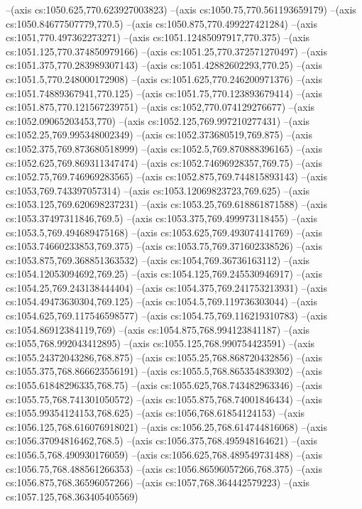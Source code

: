 --(axis cs:1050.625,770.623927003823)
--(axis cs:1050.75,770.561193659179)
--(axis cs:1050.84677507779,770.5)
--(axis cs:1050.875,770.499227421284)
--(axis cs:1051,770.497362273271)
--(axis cs:1051.12485097917,770.375)
--(axis cs:1051.125,770.374850979166)
--(axis cs:1051.25,770.372571270497)
--(axis cs:1051.375,770.283989307143)
--(axis cs:1051.42882602293,770.25)
--(axis cs:1051.5,770.248000172908)
--(axis cs:1051.625,770.246200971376)
--(axis cs:1051.74889367941,770.125)
--(axis cs:1051.75,770.123893679414)
--(axis cs:1051.875,770.121567239751)
--(axis cs:1052,770.074129276677)
--(axis cs:1052.09065203453,770)
--(axis cs:1052.125,769.997210277431)
--(axis cs:1052.25,769.995348002349)
--(axis cs:1052.373680519,769.875)
--(axis cs:1052.375,769.873680518999)
--(axis cs:1052.5,769.870888396165)
--(axis cs:1052.625,769.869311347474)
--(axis cs:1052.74696928357,769.75)
--(axis cs:1052.75,769.746969283565)
--(axis cs:1052.875,769.744815893143)
--(axis cs:1053,769.743397057314)
--(axis cs:1053.12069823723,769.625)
--(axis cs:1053.125,769.620698237231)
--(axis cs:1053.25,769.618861871588)
--(axis cs:1053.37497311846,769.5)
--(axis cs:1053.375,769.499973118455)
--(axis cs:1053.5,769.494689475168)
--(axis cs:1053.625,769.493074141769)
--(axis cs:1053.74660233853,769.375)
--(axis cs:1053.75,769.371602338526)
--(axis cs:1053.875,769.368851363532)
--(axis cs:1054,769.36736163112)
--(axis cs:1054.12053094692,769.25)
--(axis cs:1054.125,769.245530946917)
--(axis cs:1054.25,769.243138444404)
--(axis cs:1054.375,769.241753213931)
--(axis cs:1054.49473630304,769.125)
--(axis cs:1054.5,769.119736303044)
--(axis cs:1054.625,769.117546598577)
--(axis cs:1054.75,769.116219310783)
--(axis cs:1054.86912384119,769)
--(axis cs:1054.875,768.994123841187)
--(axis cs:1055,768.992043412895)
--(axis cs:1055.125,768.990754423591)
--(axis cs:1055.24372043286,768.875)
--(axis cs:1055.25,768.868720432856)
--(axis cs:1055.375,768.866623556191)
--(axis cs:1055.5,768.865354839302)
--(axis cs:1055.61848296335,768.75)
--(axis cs:1055.625,768.743482963346)
--(axis cs:1055.75,768.741301050572)
--(axis cs:1055.875,768.74001846434)
--(axis cs:1055.99354124153,768.625)
--(axis cs:1056,768.61854124153)
--(axis cs:1056.125,768.616076918021)
--(axis cs:1056.25,768.614744816068)
--(axis cs:1056.37094816462,768.5)
--(axis cs:1056.375,768.495948164621)
--(axis cs:1056.5,768.490930176059)
--(axis cs:1056.625,768.489549731488)
--(axis cs:1056.75,768.488561266353)
--(axis cs:1056.86596057266,768.375)
--(axis cs:1056.875,768.36596057266)
--(axis cs:1057,768.364442579223)
--(axis cs:1057.125,768.363405405569)
